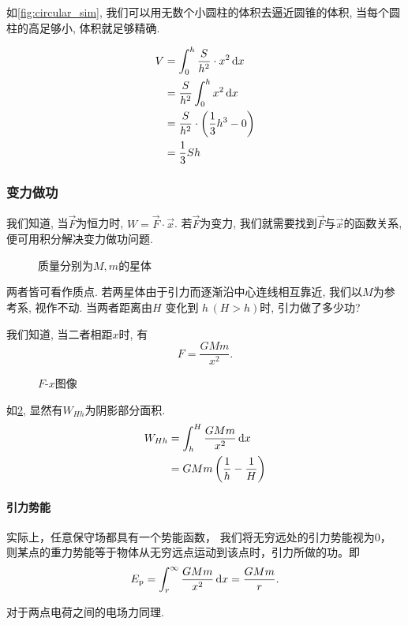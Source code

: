 如\cref{fig:circular_sim}, 我们可以用无数个小圆柱的体积去逼近圆锥的体积, 当每个圆柱的高足够小, 体积就足够精确.

\begin{align*}
  V & = \int _0^{h} \frac{S}{h^{2} }\cdot x^{2} \mathop{}\!\mathrm{d} x         \\
  & = \frac{S}{h^{2} }\int _0^{h} x^{2}\mathop{}\!\mathrm{d} x                \\
  & = \frac{S}{h^{2}} \cdot \left(\frac{1}{3} h^3 -0 \right) \\
  & = \frac{1}{3} Sh
\end{align*}

\subsubsection{变力做功}
我们知道, 当$\vec{F} $为恒力时, $W = \vec{F} \cdot \vec{x} $.
若$\vec{F} $为变力, 我们就需要找到$\vec{F} $与$\vec{x} $的函数关系, 便可用积分解决变力做功问题.

\begin{figure}
  \centering
    
  \caption{质量分别为$M,m$的星体}\label{fig:planet}
\end{figure}

\begin{example}
  两者皆可看作质点.
  若两星体由于引力而逐渐沿中心连线相互靠近,
  我们以$M$为参考系, 视作不动.
  当两者距离由$H$ 变化到 $h \, (H>h)$时, 引力做了多少功?

  我们知道, 当二者相距$x$时, 有
  \[
    F = \frac{GMm}{x^2}
  .\]

  \begin{figure}[ht]
    \centering
      
    \caption{$F$-$x$图像}\label{fig:Fx}
  \end{figure}

  如\cref{fig:Fx}, 显然有$W_{Hh}$为阴影部分面积.
  \begin{align*}
    W_{Hh} & = \int _{h} ^{H} \frac{GMm}{x^2} \mathop{}\!\mathrm{d} x    \\
    & = GMm \left(\frac{1}{h}-\frac{1}{H}\right)
  \end{align*}

  \paragraph{引力势能}
  实际上，任意保守场都具有一个势能函数，
  我们将无穷远处的引力势能视为$0$，
  则某点的重力势能等于物体从无穷远点运动到该点时，引力所做的功。即
  \[
    E_{\mathrm{p}} = \int_r^\infty \frac {GMm} {x^2} \mathop{}\!\mathrm{d} x=\frac {GMm}r
  .\]

  对于两点电荷之间的电场力同理.

\end{example}
